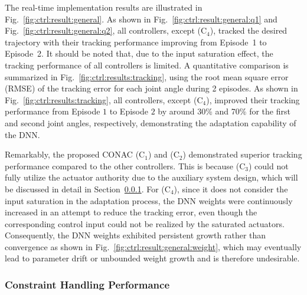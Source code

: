 \documentclass[letterpaper, journal]{IEEEtran}
\begin{document}
The real-time implementation results are illustrated in Fig.~\ref{fig:ctrl:result:general}.
As shown in Fig.~\ref{fig:ctrl:result:general:q1} and Fig.~\ref{fig:ctrl:result:general:q2}, all controllers, except (C$_4$), tracked the desired trajectory with their tracking performance improving from
Episode~1 to Episode~2.
It should be noted that, due to the input saturation effect, the tracking performance of all controllers is limited.
A quantitative comparison is summarized in Fig.~\ref{fig:ctrl:results:tracking}, using the root mean square error (RMSE) of the tracking error for each joint angle during 2 episodes.
As shown in Fig.~\ref{fig:ctrl:results:tracking}, all controllers, except (C$_4$), improved their tracking performance from Episode $1$ to Episode $2$ by around 30\% and 70\% for the first and second joint angles, respectively, demonstrating the adaptation capability of the DNN.

Remarkably, the proposed CONAC (C$_1$) and (C$_2$) demonstrated superior tracking performance compared to the other controllers.
This is because (C$_3$) could not fully utilize the actuator authority due to the auxiliary system design, which will be discussed in detail in Section~\ref{sec:val:results:constraint}.
For (C$_4$), since it does not consider the input saturation in the adaptation process, the DNN weights were continuously increased in an attempt to reduce the tracking error, even though the corresponding control input could not be realized by the saturated actuators.
Consequently, the DNN weights exhibited persistent growth rather than convergence as shown in Fig.~\ref{fig:ctrl:result:general:weight}, which may eventually lead to parameter drift or unbounded weight growth and is therefore undesirable.


\subsubsection{Constraint Handling Performance} \label{sec:val:results:constraint}
\end{document}
